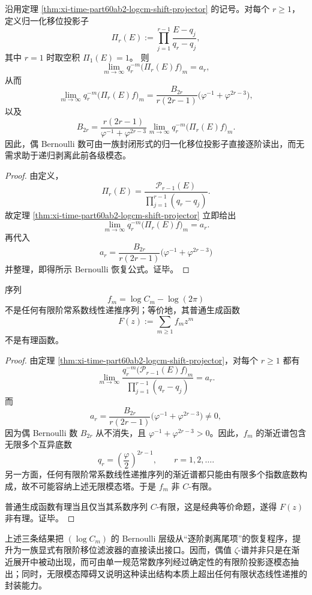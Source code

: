 \begin{corollary}\label{cor:xi-time-part60ab2-logcm-normalized-projector-bernoulli}
沿用定理 \ref{thm:xi-time-part60ab2-logcm-shift-projector} 的记号。对每个 \(r\ge 1\)，定义归一化移位投影子
\[
\Pi_r(E):=
\prod_{j=1}^{r-1}\frac{E-q_j}{q_r-q_j},
\]
其中 \(r=1\) 时取空积 \(\Pi_1(E)=1\)。
则
\[
\lim_{m\to\infty}q_r^{-m}\bigl(\Pi_r(E)f\bigr)_m=a_r,
\]
从而
\[
\lim_{m\to\infty}q_r^{-m}\bigl(\Pi_r(E)f\bigr)_m
=
\frac{B_{2r}}{r(2r-1)}\bigl(\varphi^{-1}+\varphi^{2r-3}\bigr),
\]
以及
\[
B_{2r}
=
\frac{r(2r-1)}{\varphi^{-1}+\varphi^{2r-3}}
\lim_{m\to\infty}q_r^{-m}\bigl(\Pi_r(E)f\bigr)_m.
\]
因此，偶 Bernoulli 数可由一族封闭形式的归一化移位投影子直接逐阶读出，而无需求助于递归剥离此前各级模态。
\end{corollary}
\begin{proof}
由定义，
\[
\Pi_r(E)
=
\frac{\mathcal P_{r-1}(E)}{\prod_{j=1}^{r-1}(q_r-q_j)}.
\]
故定理 \ref{thm:xi-time-part60ab2-logcm-shift-projector} 立即给出
\[
\lim_{m\to\infty}q_r^{-m}\bigl(\Pi_r(E)f\bigr)_m=a_r.
\]
再代入
\[
a_r=\frac{B_{2r}}{r(2r-1)}\bigl(\varphi^{-1}+\varphi^{2r-3}\bigr)
\]
并整理，即得所示 Bernoulli 恢复公式。证毕。
\end{proof}

\begin{theorem}\label{thm:xi-time-part60ab2-logcm-shift-infinite-modal}
序列
\[
f_m=\log C_m-\log(2\pi)
\]
不是任何有限阶常系数线性递推序列；等价地，其普通生成函数
\[
F(z):=\sum_{m\ge 1}f_m z^m
\]
不是有理函数。
\end{theorem}
\begin{proof}
由定理 \ref{thm:xi-time-part60ab2-logcm-shift-projector}，对每个 \(r\ge 1\) 都有
\[
\lim_{m\to\infty}
\frac{q_r^{-m}\bigl(\mathcal P_{r-1}(E)f\bigr)_m}
{\prod_{j=1}^{r-1}(q_r-q_j)}
=a_r.
\]
而
\[
a_r=
\frac{B_{2r}}{r(2r-1)}\bigl(\varphi^{-1}+\varphi^{2r-3}\bigr)\neq 0,
\]
因为偶 Bernoulli 数 \(B_{2r}\) 从不消失，且 \(\varphi^{-1}+\varphi^{2r-3}>0\)。因此，\(f_m\) 的渐近谱包含无限多个互异底数
\[
q_r=\left(\frac{\varphi}{2}\right)^{2r-1},
\qquad
r=1,2,\dots.
\]
另一方面，任何有限阶常系数线性递推序列的渐近谱都只能由有限多个指数底数构成，故不可能容纳上述无限模态塔。于是 \(f_m\) 非 \(C\)-有限。

普通生成函数有理当且仅当其系数序列 \(C\)-有限，这是经典等价命题，遂得 \(F(z)\) 非有理。证毕。
\end{proof}

\noindent
上述三条结果把 \((\log C_m)\) 的 Bernoulli 层级从“逐阶剥离尾项”的恢复程序，提升为一族显式有限阶移位滤波器的直接读出接口。因而，偶值 \(\zeta\)-谱并非只是在渐近展开中被动出现，而可由单一规范常数序列经过确定性的有限阶投影逐模态抽出；同时，无限模态障碍又说明这种读出结构本质上超出任何有限状态线性递推的封装能力。

\endinput
